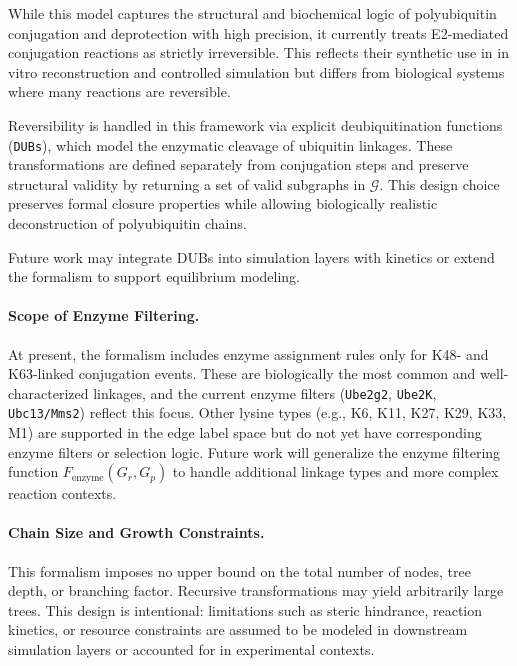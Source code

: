 \documentclass[12pt]{article}
\begin{document}
While this model captures the structural and biochemical logic of polyubiquitin conjugation and deprotection with high precision, it currently treats E2-mediated conjugation reactions as strictly irreversible. This reflects their synthetic use in in vitro reconstruction and controlled simulation but differs from biological systems where many reactions are reversible.

Reversibility is handled in this framework via explicit deubiquitination functions (\texttt{DUBs}), which model the enzymatic cleavage of ubiquitin linkages. These transformations are defined separately from conjugation steps and preserve structural validity by returning a set of valid subgraphs in \(\mathcal{G}\). This design choice preserves formal closure properties while allowing biologically realistic deconstruction of polyubiquitin chains.

Future work may integrate DUBs into simulation layers with kinetics or extend the formalism to support equilibrium modeling.

\paragraph{Scope of Enzyme Filtering.} 
At present, the formalism includes enzyme assignment rules only for K48- and K63-linked conjugation events. These are biologically the most common and well-characterized linkages, and the current enzyme filters (\texttt{Ube2g2}, \texttt{Ube2K}, \texttt{Ubc13/Mms2}) reflect this focus. Other lysine types (e.g., K6, K11, K27, K29, K33, M1) are supported in the edge label space but do not yet have corresponding enzyme filters or selection logic. Future work will generalize the enzyme filtering function $F_{\text{enzyme}}(G_r, G_p)$ to handle additional linkage types and more complex reaction contexts.

\paragraph{Chain Size and Growth Constraints.}
This formalism imposes no upper bound on the total number of nodes, tree depth, or branching factor. Recursive transformations may yield arbitrarily large trees. This design is intentional: limitations such as steric hindrance, reaction kinetics, or resource constraints are assumed to be modeled in downstream simulation layers or accounted for in experimental contexts.
\end{document}
